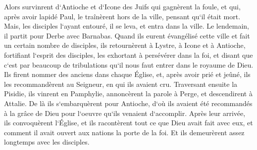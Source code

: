 \verse Alors survinrent d`Antioche et d`Icone des Juifs qui gagnèrent la foule, et qui, après avoir lapidé Paul, le traînèrent hors de la ville, pensant qu`il était mort. 
\verse Mais, les disciples l`ayant entouré, il se leva, et entra dans la ville. Le lendemain, il partit pour Derbe avec Barnabas. 
\verse Quand ils eurent évangélisé cette ville et fait un certain nombre de disciples, ils retournèrent à Lystre, à Icone et à Antioche, 
\verse fortifiant l`esprit des disciples, les exhortant à persévérer dans la foi, et disant que c`est par beaucoup de tribulations qu`il nous faut entrer dans le royaume de Dieu. 
\verse Ils firent nommer des anciens dans chaque Église, et, après avoir prié et jeûné, ils les recommandèrent au Seigneur, en qui ils avaient cru. 
\verse Traversant ensuite la Pisidie, ils vinrent en Pamphylie, 
\verse annoncèrent la parole à Perge, et descendirent à Attalie. 
\verse De là ils s`embarquèrent pour Antioche, d`où ils avaient été recommandés à la grâce de Dieu pour l`oeuvre qu`ils venaient d`accomplir. 
\verse Après leur arrivée, ils convoquèrent l`Église, et ils racontèrent tout ce que Dieu avait fait avec eux, et comment il avait ouvert aux nations la porte de la foi. 
\verse Et ils demeurèrent assez longtemps avec les disciples. 

\chapter{}

